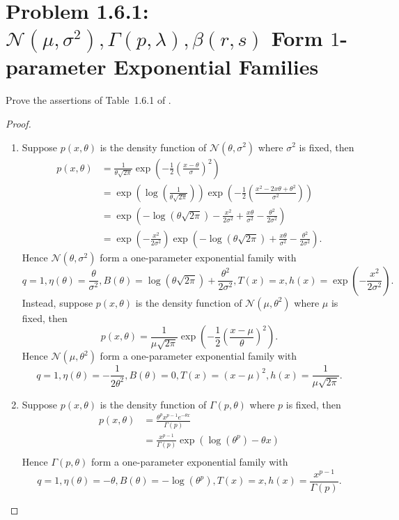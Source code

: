 \documentclass{amsbook}
\theoremstyle{definition}
\theoremstyle{remark}
\numberwithin{section}{chapter}
\numberwithin{equation}{chapter}
\begin{document}
\section{Problem 1.6.1: $\mathcal{N}(\mu,\sigma^2),\Gamma(p,\lambda),\beta(r,s)$ Form $1$-parameter Exponential Families}
Prove the assertions of Table~1.6.1 of \cite{bickel2015mathematical}.
\begin{proof}
\begin{enumerate}
\item Suppose $p(x,\theta)$ is the density function of $\mathcal{N}(\theta,\sigma^2)$ where $\sigma^2$ is fixed, then\[
\begin{split}
p(x,\theta)&=\frac{1}{\theta\sqrt{2\pi}}\exp\left(-\frac{1}{2}\left(\frac{x-\theta}{\sigma}\right)^2\right)\\
&=\exp\left(\log\left(\frac{1}{\theta\sqrt{2\pi}}\right)\right)\exp\left(-\frac{1}{2}\left(\frac{x^2-2x\theta+\theta^2}{\sigma^2}\right)\right)\\
&=\exp\left(-\log(\theta\sqrt{2\pi})-\frac{x^2}{2\sigma^2}+\frac{x\theta}{\sigma^2}-\frac{\theta^2}{2\sigma^2}\right)\\
&=\exp\left(-\frac{x^2}{2\sigma^2}\right)\exp\left(-\log(\theta\sqrt{2\pi})+\frac{x\theta}{\sigma^2}-\frac{\theta^2}{2\sigma^2}\right).
\end{split}
\]Hence $\mathcal{N}(\theta,\sigma^2)$ form a one-parameter exponential family with\[
q=1,\eta(\theta)=\frac{\theta}{\sigma^2},B(\theta)=\log(\theta\sqrt{2\pi})+\frac{\theta^2}{2\sigma^2},T(x)=x,h(x)=\exp\left(-\frac{x^2}{2\sigma^2}\right).
\]Instead, suppose $p(x,\theta)$ is the density function of $\mathcal{N}(\mu,\theta^2)$ where $\mu$ is fixed, then\[
p(x,\theta)=\frac{1}{\mu\sqrt{2\pi}}\exp\left(-\frac{1}{2}\left(\frac{x-\mu}{\theta}\right)^2\right).
\]Hence $\mathcal{N}(\mu,\theta^2)$ form a one-parameter exponential family with\[
q=1,\eta(\theta)=-\frac{1}{2\theta^2},B(\theta)=0,T(x)=(x-\mu)^2,h(x)=\frac{1}{\mu\sqrt{2\pi}}.
\]
\item Suppose $p(x,\theta)$ is the density function of $\Gamma(p,\theta)$ where $p$ is fixed, then\[
\begin{split}
p(x,\theta)&=\frac{\theta^px^{p-1}e^{-\theta x}}{\Gamma(p)}\\
&=\frac{x^{p-1}}{\Gamma(p)}\exp(\log(\theta^p)-\theta x)\\
\end{split}
\]Hence $\Gamma(p,\theta)$ form a one-parameter exponential family with\[
q=1,\eta(\theta)=-\theta,B(\theta)=-\log(\theta^p),T(x)=x,h(x)=\frac{x^{p-1}}{\Gamma(p)}.
\]
\end{enumerate}
\end{proof}
\end{document}

